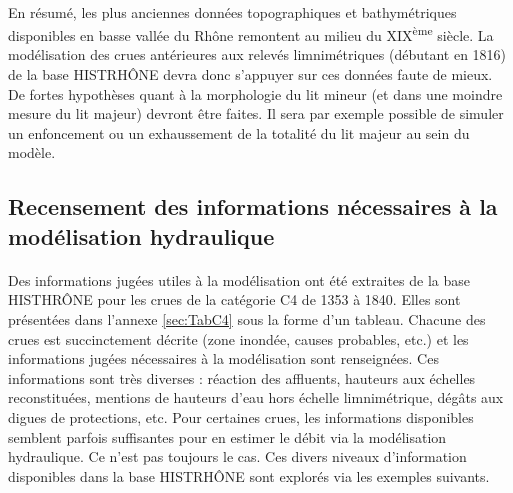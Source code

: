 	\paragraph{} En résumé, les plus anciennes données topographiques et bathymétriques disponibles en basse vallée du Rhône remontent au milieu du XIX\textsuperscript{ème} siècle. La modélisation des crues antérieures aux relevés limnimétriques (débutant en 1816) de la base HISTRHÔNE devra donc s'appuyer sur ces données faute de mieux. De fortes hypothèses quant à la morphologie du lit mineur (et dans une moindre mesure du lit majeur) devront être faites. Il sera par exemple possible de simuler un enfoncement ou un exhaussement de la totalité du lit majeur au sein du modèle. 
	
\FloatBarrier	
	
	\subsection{Recensement des informations nécessaires à la modélisation hydraulique} 
	
	\paragraph{} Des informations jugées utiles à la modélisation ont été extraites de la base HISTHRÔNE pour les crues de la catégorie C4 de 1353 à 1840. Elles sont présentées dans l'annexe \ref{sec:TabC4} sous la forme d'un tableau. Chacune des crues est succinctement décrite (zone inondée, causes probables, etc.) et les informations jugées nécessaires à la modélisation sont renseignées. Ces informations sont très diverses : réaction des affluents, hauteurs aux échelles reconstituées, mentions de hauteurs d'eau hors échelle limnimétrique, dégâts aux digues de protections, etc. Pour certaines crues, les informations disponibles semblent parfois suffisantes pour en estimer le débit via la modélisation hydraulique. Ce n'est pas toujours le cas. Ces divers niveaux d'information disponibles dans la base HISTRHÔNE sont explorés via les exemples suivants. 
	
